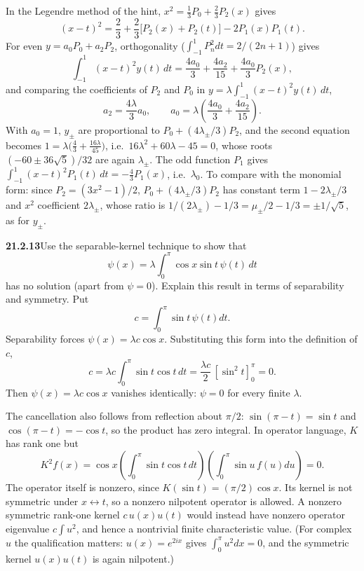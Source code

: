 In the Legendre method of the hint, $x^2=\frac13P_0+\frac23P_2(x)$
gives
\[
(x-t)^2=\frac23+\frac23\bigl[P_2(x)+P_2(t)\bigr]-2P_1(x)P_1(t).
\]
For even $y=a_0P_0+a_2P_2$, orthogonality
($\int_{-1}^1P_n^2dt=2/(2n+1)$) gives
\[
\int_{-1}^1(x-t)^2y(t)\,dt=\frac{4a_0}{3}+\frac{4a_2}{15}
+\frac{4a_0}{3}P_2(x),
\]
and comparing the coefficients of $P_2$ and $P_0$ in
$y=\lambda\int_{-1}^1(x-t)^2y(t)\,dt$,
\[
a_2=\frac{4\lambda}{3}a_0,\qquad
a_0=\lambda\left(\frac{4a_0}{3}+\frac{4a_2}{15}\right).
\]
With $a_0=1$, $y_\pm$ are proportional to $P_0+(4\lambda_\pm/3)P_2$,
and the second equation becomes
$1=\lambda\bigl(\frac43+\frac{16\lambda}{45}\bigr)$, i.e.\
$16\lambda^2+60\lambda-45=0$, whose roots
$(-60\pm36\sqrt5)/32$ are again $\lambda_\pm$. The odd function $P_1$
gives $\int_{-1}^1(x-t)^2P_1(t)\,dt=-\frac43P_1(x)$, i.e.\ $\lambda_0$.
To compare with the monomial form: since $P_2=(3x^2-1)/2$,
$P_0+(4\lambda_\pm/3)P_2$ has constant term
$1-2\lambda_\pm/3$ and $x^2$ coefficient $2\lambda_\pm$, whose ratio is
$1/(2\lambda_\pm)-1/3=\mu_\pm/2-1/3=\pm1/\sqrt5$, as for $y_\pm$.


\par\bigskip
\noindent\textbf{21.2.13}\quad Use the separable-kernel technique
to show that
\[
\psi(x)=\lambda\int_{0}^{\pi}\cos x\sin t\,\psi(t)\,dt
\]
has no solution (apart from $\psi=0$). Explain this result in
terms of separability and symmetry.
\solution
Put
\[
c=\int_0^\pi\sin t\,\psi(t)dt.
\]
Separability forces $\psi(x)=\lambda c\cos x$. Substituting this
form into the definition of $c$,
\[
c=\lambda c\int_0^\pi\sin t\cos t\,dt
=\frac{\lambda c}{2}\,[\sin^2t]_0^\pi=0.
\]
Then $\psi(x)=\lambda c\cos x$ vanishes identically: $\boxed{\psi=0}$
for every finite $\lambda$.

The cancellation also follows from reflection about $\pi/2$:
$\sin(\pi-t)=\sin t$ and $\cos(\pi-t)=-\cos t$, so the product
has zero integral. In operator language, $K$ has rank one but
\[
K^2f(x)=\cos x
\left(\int_0^\pi\sin t\cos t\,dt\right)
\left(\int_0^\pi\sin u\,f(u)du\right)=0.
\]
The operator itself is nonzero, since $K(\sin t)=(\pi/2)\cos x$.
Its kernel is not symmetric under $x\leftrightarrow t$, so a nonzero
nilpotent operator is allowed. A nonzero \erratum{real} symmetric rank-one kernel
$c\,u(x)u(t)$ would instead have nonzero operator eigenvalue
$c\int u^2$, and hence a nontrivial finite characteristic value.
(For complex $u$ the qualification matters: $u(x)=e^{2ix}$ gives
$\int_0^\pi u^2dx=0$, and the symmetric kernel $u(x)u(t)$ is again
nilpotent.)


